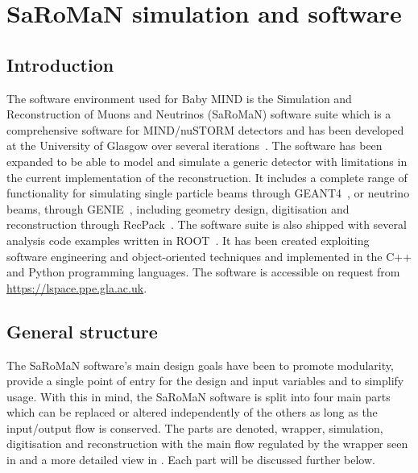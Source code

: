 \chapter{SaRoMaN simulation and software}
\label{c:software}

\section{Introduction}

The software environment used for Baby MIND is the Simulation and Reconstruction of Muons and Neutrinos (SaRoMaN) software suite which is a comprehensive software for MIND/nuSTORM detectors and has been developed at the University of Glasgow over several iterations~\cite{27Bross,  53Laing, 54NUFACT2016Hallsjo}. The software has been expanded to be able to model and simulate a generic detector with limitations in the current implementation of the reconstruction. It includes a complete range of functionality for simulating single particle beams through GEANT4~\cite{Geant4}, or neutrino beams, through GENIE~\cite{Genie}, including geometry design, digitisation and reconstruction through RecPack~\cite{RecPack}. The software suite is also shipped with several analysis code examples written in ROOT~\cite{Root}. It has been created exploiting software engineering and object-oriented techniques and implemented in the C++ and Python programming languages. The software is accessible on request from \url{https://lspace.ppe.gla.ac.uk}. 

\section{General structure}
The SaRoMaN software's main design goals have been to promote modularity, provide a single point of entry for the design and input variables and to simplify usage. With this in mind, the SaRoMaN software is split into four main parts which can be replaced or altered independently of the others as long as the input/output flow is conserved. The parts are denoted, wrapper, simulation, digitisation and reconstruction with the main flow regulated by the wrapper seen in  and a more detailed view in . Each part will be discussed further below.

